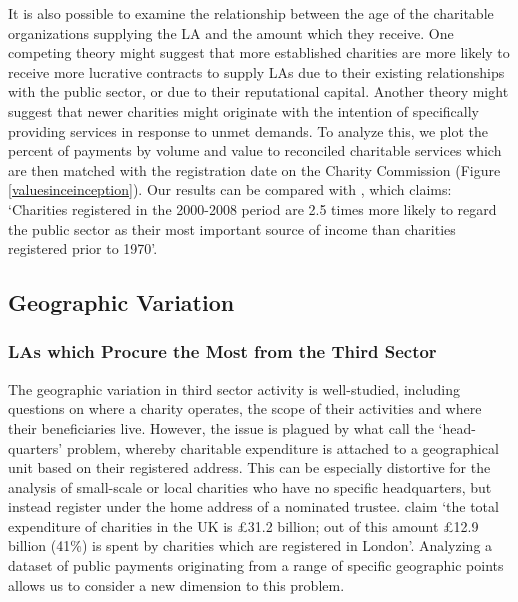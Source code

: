 \documentclass[12pt]{article}
\begin{document}
It is also possible to examine the relationship between the age of the charitable organizations supplying the LA and the amount which they receive. One competing theory might suggest that more established charities are more likely to receive more lucrative contracts to supply LAs due to their existing relationships with the public sector, or due to their reputational capital. Another theory might suggest that newer charities might originate with the intention of specifically providing services in response to unmet demands. To analyze this, we plot the percent of payments by volume and value to reconciled charitable services which are then matched with the registration date on the Charity Commission (Figure \ref{valuesinceinception}). Our results can be compared with \cite[p.11]{cliffordfreidamohan2010}, which claims: `Charities registered in the 2000-2008 period are 2.5 times more likely to regard the public sector as their most important source of income than charities registered prior to 1970'.

\subsection{Geographic Variation}

\subsubsection{LAs which Procure the Most from the Third Sector}

The geographic variation in third sector activity is well-studied, including questions on where a charity operates, the scope of their activities and where their beneficiaries live. However, the issue is plagued by what \cite{kane2009} call the ‘head-quarters’ problem, whereby charitable expenditure is attached to a geographical unit based on their registered address. This can be especially distortive for the analysis of small-scale or local charities who have no specific headquarters, but instead register under the home address of a nominated trustee. \cite{kane2009} claim ‘the total expenditure of charities in the UK is £31.2 billion; out of this amount £12.9 billion (41\%) is spent by charities which are registered in London’. Analyzing a dataset of public payments originating from a range of specific geographic points allows us to consider a new dimension to this problem.
\end{document}
